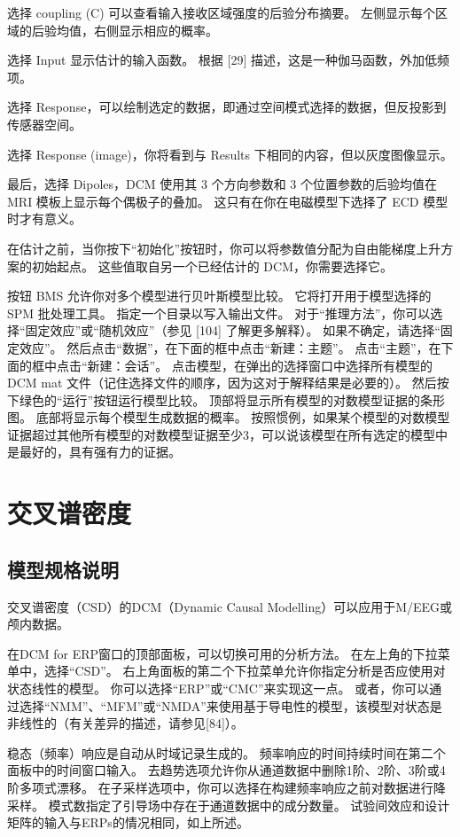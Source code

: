 选择 coupling (C) 可以查看输入接收区域强度的后验分布摘要。
左侧显示每个区域的后验均值，右侧显示相应的概率。

选择 Input 显示估计的输入函数。
根据 [29] 描述，这是一种伽马函数，外加低频项。

选择 Response，可以绘制选定的数据，即通过空间模式选择的数据，但反投影到传感器空间。

选择 Response (image)，你将看到与 Results 下相同的内容，但以灰度图像显示。

最后，选择 Dipoles，DCM 使用其 3 个方向参数和 3 个位置参数的后验均值在 MRI 模板上显示每个偶极子的叠加。
这只有在你在电磁模型下选择了 ECD 模型时才有意义。

在估计之前，当你按下“初始化”按钮时，你可以将参数值分配为自由能梯度上升方案的初始起点。
这些值取自另一个已经估计的 DCM，你需要选择它。

按钮 BMS 允许你对多个模型进行贝叶斯模型比较。
它将打开用于模型选择的 SPM 批处理工具。
指定一个目录以写入输出文件。
对于“推理方法”，你可以选择“固定效应”或“随机效应”（参见 [104] 了解更多解释）。
如果不确定，请选择“固定效应”。
然后点击“数据”，在下面的框中点击“新建：主题”。
点击“主题”，在下面的框中点击“新建：会话”。
点击模型，在弹出的选择窗口中选择所有模型的 DCM mat 文件（记住选择文件的顺序，因为这对于解释结果是必要的）。
然后按下绿色的“运行”按钮运行模型比较。
顶部将显示所有模型的对数模型证据的条形图。
底部将显示每个模型生成数据的概率。
按照惯例，如果某个模型的对数模型证据超过其他所有模型的对数模型证据至少3，可以说该模型在所有选定的模型中是最好的，具有强有力的证据。


\section{交叉谱密度}


\subsection{模型规格说明}

交叉谱密度（CSD）的DCM（Dynamic Causal Modelling）可以应用于M/EEG或颅内数据。

在DCM for ERP窗口的顶部面板，可以切换可用的分析方法。
在左上角的下拉菜单中，选择“CSD”。
右上角面板的第二个下拉菜单允许你指定分析是否应使用对状态线性的模型。
你可以选择“ERP”或“CMC”来实现这一点。
或者，你可以通过选择“NMM”、“MFM”或“NMDA”来使用基于导电性的模型，该模型对状态是非线性的（有关差异的描述，请参见[84]）。

稳态（频率）响应是自动从时域记录生成的。
频率响应的时间持续时间在第二个面板中的时间窗口输入。
去趋势选项允许你从通道数据中删除1阶、2阶、3阶或4阶多项式漂移。
在子采样选项中，你可以选择在构建频率响应之前对数据进行降采样。
模式数指定了引导场中存在于通道数据中的成分数量。
试验间效应和设计矩阵的输入与ERPs的情况相同，如上所述。


